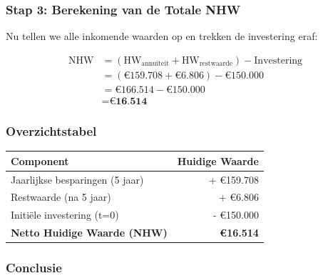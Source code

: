 \documentclass[a4paper,11pt]{article}
\begin{document}
\begin{oefenblok}
\subsubsection*{Stap 3: Berekening van de Totale NHW}

Nu tellen we alle inkomende waarden op en trekken de investering eraf:

\begin{align*}
\text{NHW} &= (\text{HW}_{\text{annuïteit}} + \text{HW}_{\text{restwaarde}}) - \text{Investering} \\
&= (€159.708 + €6.806) - €150.000 \\
&= €166.514 - €150.000 \\
&= \textbf{€16.514}
\end{align*}

\subsubsection*{Overzichtstabel}

\begin{center}
\begin{tabular}{|l|r|}
\hline
\textbf{Component} & \textbf{Huidige Waarde} \\
\hline
Jaarlijkse besparingen (5 jaar) & + €159.708 \\
\hline
Restwaarde (na 5 jaar) & + €6.806 \\
\hline
Initiële investering (t=0) & - €150.000 \\
\hline
\textbf{Netto Huidige Waarde (NHW)} & \textbf{€16.514} \\
\hline
\end{tabular}
\end{center}

\subsubsection*{Conclusie}

\begin{center}
\end{center}
\end{oefenblok}
\end{document}
